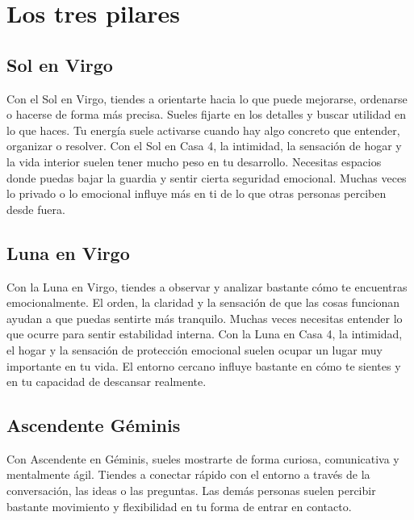 \documentclass[11pt,a4paper]{article}
\begin{document}
\vspace{0.8cm}


\section{Los tres pilares}

\subsection{Sol en Virgo}

Con el Sol en Virgo, tiendes a orientarte hacia lo que puede mejorarse, ordenarse o hacerse de forma más precisa. Sueles fijarte en los detalles y buscar utilidad en lo que haces. Tu energía suele activarse cuando hay algo concreto que entender, organizar o resolver. Con el Sol en Casa 4, la intimidad, la sensación de hogar y la vida interior suelen tener mucho peso en tu desarrollo. Necesitas espacios donde puedas bajar la guardia y sentir cierta seguridad emocional. Muchas veces lo privado o lo emocional influye más en ti de lo que otras personas perciben desde fuera.

\vspace{0.8cm}

\subsection{Luna en Virgo}

Con la Luna en Virgo, tiendes a observar y analizar bastante cómo te encuentras emocionalmente. El orden, la claridad y la sensación de que las cosas funcionan ayudan a que puedas sentirte más tranquilo. Muchas veces necesitas entender lo que ocurre para sentir estabilidad interna. Con la Luna en Casa 4, la intimidad, el hogar y la sensación de protección emocional suelen ocupar un lugar muy importante en tu vida. El entorno cercano influye bastante en cómo te sientes y en tu capacidad de descansar realmente.

\vspace{0.8cm}

\subsection{Ascendente Géminis}

Con Ascendente en Géminis, sueles mostrarte de forma curiosa, comunicativa y mentalmente ágil. Tiendes a conectar rápido con el entorno a través de la conversación, las ideas o las preguntas. Las demás personas suelen percibir bastante movimiento y flexibilidad en tu forma de entrar en contacto.
\end{document}
